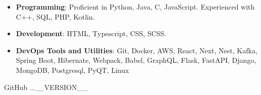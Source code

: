 \documentclass[10pt,a4paper,ragged2e]{classes/altacv}
\begin{document}

\smallskip
\begin{itemize}
\item \textbf{Programming}: Proficient in Python, Java, C, JavaScript. Experienced with C++, SQL, PHP, Kotlin.
\smallskip
\item \textbf{Development}: HTML, Typescript, CSS, SCSS.
\smallskip
\item \textbf{DevOps Tools and Utilities}: Git, Docker, AWS, React, Next, Nest, Kafka, Spring Boot, Hibernate, Webpack, Babel, GraphQL, Flask, FastAPI, Django, MongoDB, Postgresql, PyQT, Linux  
\smallskip
\end{itemize}

\smallskip
\begin{footnotesize}
GitHub \number \month .\number\year.__VERSION__
\end{footnotesize}
\clearpage
\end{document}
